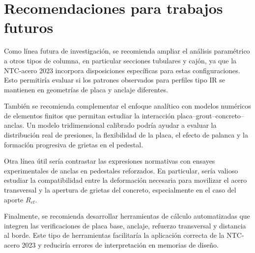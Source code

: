 \section{Recomendaciones para trabajos futuros}

Como línea futura de investigación, se recomienda ampliar el análisis paramétrico a otros tipos de
columna, en particular secciones tubulares y cajón, ya que la NTC-acero 2023 incorpora disposiciones
específicas para estas configuraciones. Esto permitiría evaluar si los patrones observados para
perfiles tipo IR se mantienen en geometrías de placa y anclaje diferentes.

También se recomienda complementar el enfoque analítico con modelos numéricos de elementos finitos
que permitan estudiar la interacción placa--grout--concreto--anclas. Un modelo tridimensional
calibrado podría ayudar a evaluar la distribución real de presiones, la flexibilidad de la placa, el
efecto de palanca y la formación progresiva de grietas en el pedestal.

Otra línea útil sería contrastar las expresiones normativas con ensayes experimentales de anclas en
pedestales reforzados. En particular, sería valioso estudiar la compatibilidad entre la deformación
necesaria para movilizar el acero transversal y la apertura de grietas del concreto, especialmente
en el caso del aporte $R_{et}$.

Finalmente, se recomienda desarrollar herramientas de cálculo automatizadas que integren las
verificaciones de placa base, anclaje, refuerzo transversal y distancia al borde. Este tipo de
herramientas facilitaría la aplicación correcta de la NTC-acero 2023 y reduciría errores de
interpretación en memorias de diseño.

